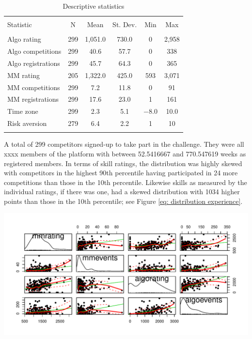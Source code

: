 \documentclass[12pt,]{article}
\theoremstyle{plain} %
\begin{document}
\begin{table}[!htbp] \centering 
  \caption{Descriptive statistics} 
  \label{} 
\begin{tabular}{@{\extracolsep{5pt}}lccccc} 
\\[-1.8ex]\hline 
\hline \\[-1.8ex] 
Statistic & \multicolumn{1}{c}{N} & \multicolumn{1}{c}{Mean} & \multicolumn{1}{c}{St. Dev.} & \multicolumn{1}{c}{Min} & \multicolumn{1}{c}{Max} \\ 
\hline \\[-1.8ex] 
Algo rating & 299 & 1,051.0 & 730.0 & 0 & 2,958 \\ 
Algo competitions & 299 & 40.6 & 57.7 & 0 & 338 \\ 
Algo registrations & 299 & 45.7 & 64.3 & 0 & 365 \\ 
MM rating & 205 & 1,322.0 & 425.0 & 593 & 3,071 \\ 
MM competitions & 299 & 7.2 & 11.8 & 0 & 91 \\ 
MM registrations & 299 & 17.6 & 23.0 & 1 & 161 \\ 
Time zone & 299 & 2.3 & 5.1 & $-$8.0 & 10.0 \\ 
Risk aversion & 279 & 6.4 & 2.2 & 1 & 10 \\ 
\hline \\[-1.8ex] 
\end{tabular} 
\end{table}

A total of 299 competitors signed-up to take part in the challenge. They
were all xxxx members of the platform with between 52.5416667 and
770.547619 weeks as registered members. In terms of skill ratings, the
distribution was highly skewed with competitors in the highest 90th
percentile having participated in 24 more competitions than those in the
10th percentile. Likewise skills as measured by the individual ratings,
if there was one, had a skewed distribution with 1034 higher points than
those in the 10th percentile; see Figure
\ref{eq: distribution experience}.

\includegraphics{Figures/unnamed-chunk-8-1.pdf}
\end{document}
